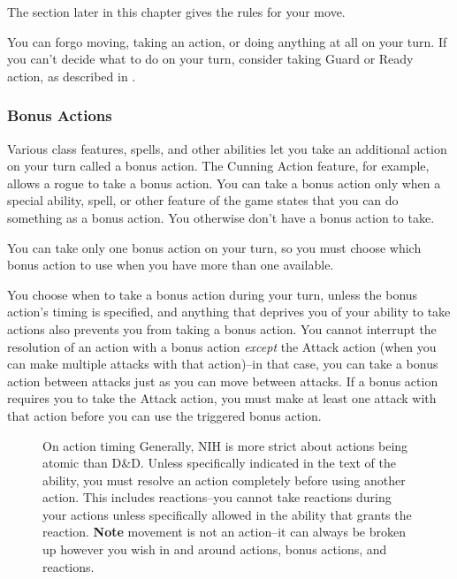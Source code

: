 The  section later in this chapter gives the rules for your move.

You can forgo moving, taking an action, or doing anything at all on your turn. If you can't decide what to do on your turn, consider taking Guard or Ready action, as described in .

\subsubsection{Bonus Actions}

Various class features, spells, and other abilities let you take an additional action on your turn called a bonus action. The Cunning Action feature, for example, allows a rogue to take a bonus action. You can take a bonus action only when a special ability, spell, or other feature of the game states that you can do something as a bonus action. You otherwise don't have a bonus action to take.

You can take only one bonus action on your turn, so you must choose which bonus action to use when you have more than one available.

You choose when to take a bonus action during your turn, unless the bonus action's timing is specified, and anything that deprives you of your ability to take actions also prevents you from taking a bonus action. You cannot interrupt the resolution of an action with a bonus action \textit{except} the Attack action (when you can make multiple attacks with that action)--in that case, you can take a bonus action between attacks just as you can move between attacks. If a bonus action requires you to take the Attack action, you must make at least one attack with that action before you can use the triggered bonus action.

\begin{figure}
    \begin{DndComment}{On action timing}
        Generally, NIH is more strict about actions being atomic than D\&D. Unless specifically indicated in the text of the ability, you must resolve an action completely before using another action. This includes reactions--you cannot take reactions during your actions unless specifically allowed in the ability that grants the reaction. \textbf{Note} movement is not an action--it can always be broken up however you wish in and around actions, bonus actions, and reactions.
    \end{DndComment}
\end{figure}

